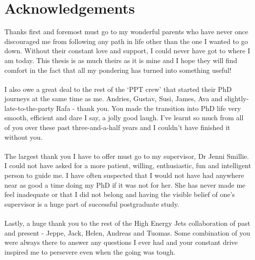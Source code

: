 \chapter{Acknowledgements}

\noindent

\normalsize

Thanks first and foremost must go to my wonderful parents who have never once discouraged me from following any path in life other than the one I wanted to go down. Without their constant love and support, I could never have got to where I am today. This thesis is as much theirs as it is mine and I hope they will find comfort in the fact that all my pondering has turned into something useful! \\
\\
I also owe a great deal to the rest of the `PPT crew' that started their PhD journeys at the same time as me. Andries, Gustav, Susi, James, Ava and slightly-late-to-the-party Rafa - thank you. You made the transition into PhD life very smooth, efficient and dare I say, a jolly good laugh. I've learnt so much from all of you over these past three-and-a-half years and I couldn't have finished it without you. \\
\\
The largest thank you I have to offer must go to my supervisor, Dr Jenni Smillie. I could not have asked for a more patient, willing, enthusiastic, fun and intelligent person to guide me. I have often suspected that I would not have had anywhere near as good a time doing my PhD if it was not for her. She has never made me feel inadequate or that I did not belong and having the visible belief of one's supervisor is a huge part of successful postgraduate study. \\
\\
Lastly, a huge thank you to the rest of the High Energy Jets collaboration of past and present - Jeppe, Jack, Helen, Andreas and Tuomas. Some combination of you were always there to answer any questions I ever had and your constant drive inspired me to persevere even when the going was tough. 


